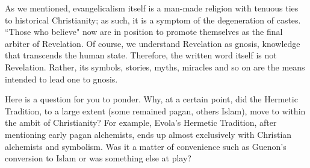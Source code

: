 \begin{footnotesize}
\begin{sffamily}
As we mentioned, evangelicalism itself is a man-made religion with tenuous ties to historical Christianity; as such, it is a symptom of the degeneration of castes. ``Those who believe" now are in position to promote themselves as the final arbiter of Revelation. Of course, we understand Revelation as gnosis, knowledge that transcends the human state. Therefore, the written word itself is not Revelation. Rather, its symbols, stories, myths, miracles and so on are the means intended to lead one to gnosis.

Here is a question for you to ponder. Why, at a certain point, did the Hermetic Tradition, to a large extent (some remained pagan, others Islam), move to within the ambit of Christianity? For example, Evola's Hermetic Tradition, after mentioning early pagan alchemists, ends up almost exclusively with Christian alchemists and symbolism. Was it a matter of convenience such as Guenon's conversion to Islam or was something else at play?


\end{sffamily}\end{footnotesize}
